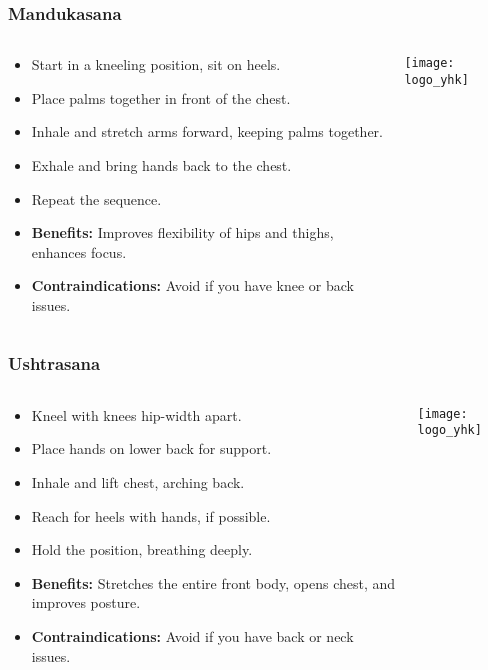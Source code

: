\begin{frame}[fragile]\frametitle{Mandukasana}
\begin{columns}
    \begin{column}[T]{0.5\linewidth}
      \begin{itemize}
        \item Start in a kneeling position, sit on heels.
        \item Place palms together in front of the chest.
        \item Inhale and stretch arms forward, keeping palms together.
        \item Exhale and bring hands back to the chest.
        \item Repeat the sequence.
        \item \textbf{Benefits:} Improves flexibility of hips and thighs, enhances focus.
        \item \textbf{Contraindications:} Avoid if you have knee or back issues.
      \end{itemize}
    \end{column}
    \begin{column}[T]{0.5\linewidth}
        \begin{center}
        \texttt{[image: logo\_yhk]}
        \end{center}    
    \end{column}
  \end{columns}
\end{frame}

\begin{frame}[fragile]\frametitle{Ushtrasana}
\begin{columns}
    \begin{column}[T]{0.5\linewidth}
      \begin{itemize}
        \item Kneel with knees hip-width apart.
        \item Place hands on lower back for support.
        \item Inhale and lift chest, arching back.
        \item Reach for heels with hands, if possible.
        \item Hold the position, breathing deeply.
        \item \textbf{Benefits:} Stretches the entire front body, opens chest, and improves posture.
        \item \textbf{Contraindications:} Avoid if you have back or neck issues.
      \end{itemize}
    \end{column}
    \begin{column}[T]{0.5\linewidth}
        \begin{center}
        \texttt{[image: logo\_yhk]}
        \end{center}    
    \end{column}
  \end{columns}
\end{frame}

